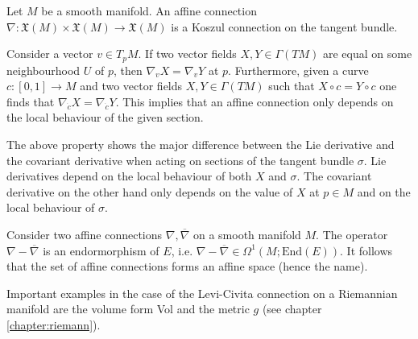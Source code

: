     \begin{example}
        Let $M$ be a smooth manifold. An affine connection $\nabla:\mathfrak{X}(M)\times\mathfrak{X}(M)\rightarrow \mathfrak{X}(M)$ is a Koszul connection on the tangent bundle.
    \end{example}

    \begin{property}
        Consider a vector $v\in T_pM$. If two vector fields $X, Y\in \Gamma(TM)$ are equal on some neighbourhood $U$ of $p$, then $\nabla_vX = \nabla_vY$ at $p$. Furthermore, given a curve $c:[0, 1]\rightarrow M$ and two vector fields $X, Y\in\Gamma(TM)$ such that $X\circ c = Y\circ c$ one finds that $\nabla_{\dot c}X = \nabla_{\dot c}Y$. This implies that an affine connection only depends on the local behaviour of the given section.
    \end{property}
    \begin{remark}
        The above property shows the major difference between the Lie derivative and the covariant derivative when acting on sections of the tangent bundle $\sigma$. Lie derivatives depend on the local behaviour of both $X$ and $\sigma$. The covariant derivative on the other hand only depends on the value of $X$ at $p\in M$ and on the local behaviour of $\sigma$.
    \end{remark}

    \begin{property}[Affinity]
        Consider two affine connections $\nabla, \overline\nabla$ on a smooth manifold $M$. The operator $\nabla-\overline\nabla$ is an endormorphism of $E$, i.e. $\nabla-\overline\nabla\in\Omega^1(M;\text{End}(E))$. It follows that the set of affine connections forms an affine space (hence the name).
    \end{property}

    \begin{example}
        Important examples in the case of the Levi-Civita connection on a Riemannian manifold are the volume form Vol and the metric $g$ (see chapter \ref{chapter:riemann}).
    \end{example}

